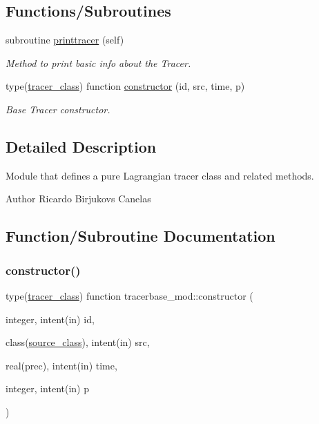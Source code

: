 \subsection*{Functions/\+Subroutines}
\begin{DoxyCompactItemize}
\item 
subroutine \mbox{\hyperlink{namespacetracerbase__mod_ae320123e374df674769dbd48ba5ef46f}{printtracer}} (self)
\begin{DoxyCompactList}\small\item\em Method to print basic info about the Tracer. \end{DoxyCompactList}\item 
type(\mbox{\hyperlink{structtracerbase__mod_1_1tracer__class}{tracer\+\_\+class}}) function \mbox{\hyperlink{namespacetracerbase__mod_aefc12c2007d7598ff9b35733b430a3a2}{constructor}} (id, src, time, p)
\begin{DoxyCompactList}\small\item\em Base Tracer constructor. \end{DoxyCompactList}\end{DoxyCompactItemize}


\subsection{Detailed Description}
Module that defines a pure Lagrangian tracer class and related methods. 

\begin{DoxyAuthor}{Author}
Ricardo Birjukovs Canelas 
\end{DoxyAuthor}


\subsection{Function/\+Subroutine Documentation}
\mbox{\label{namespacetracerbase__mod_aefc12c2007d7598ff9b35733b430a3a2}} 
\subsubsection{\texorpdfstring{constructor()}{constructor()}}
{\footnotesize\ttfamily type(\mbox{\hyperlink{structtracerbase__mod_1_1tracer__class}{tracer\+\_\+class}}) function tracerbase\+\_\+mod\+::constructor (\begin{DoxyParamCaption}\item[{integer, intent(in)}]{id,  }\item[{class(\mbox{\hyperlink{structsources__mod_1_1source__class}{source\+\_\+class}}), intent(in)}]{src,  }\item[{real(prec), intent(in)}]{time,  }\item[{integer, intent(in)}]{p }\end{DoxyParamCaption})\hspace{0.3cm}{\ttfamily [private]}}



